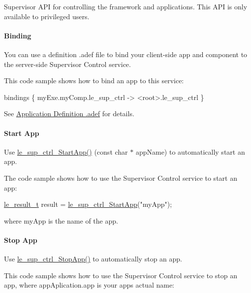 Supervisor A\+P\+I for controlling the framework and applications. This A\+P\+I is only available to privileged users.\hypertarget{c_sup_ctrl_legatoServicesSupervisor_binding}{}\paragraph{Binding}\label{c_sup_ctrl_legatoServicesSupervisor_binding}
You can use a definition {\ttfamily }.adef file to bind your client-\/side app and component to the server-\/side Supervisor Control service.

This code sample shows how to bind an app to this service\+: 
\begin{DoxyCode}
bindings
\{
myExe.myComp.le\_sup\_ctrl -> <root>.le\_sup\_ctrl
\}
\end{DoxyCode}


See \hyperlink{defFilesAdef}{Application Definition .adef} for details.\hypertarget{c_sup_ctrl_legatoServicesSupervisor_start}{}\paragraph{Start App}\label{c_sup_ctrl_legatoServicesSupervisor_start}
Use \hyperlink{le__sup__ctrl__interface_8h_a87aad682024480d38eaf889182703d61}{le\+\_\+sup\+\_\+ctrl\+\_\+\+Start\+App()} (const char $\ast$ app\+Name) to automatically start an app.

The code sample shows how to use the Supervisor Control service to start an app\+:


\begin{DoxyCode}
\hyperlink{le__basics_8h_a1cca095ed6ebab24b57a636382a6c86c}{le\_result\_t} result = \hyperlink{le__sup__ctrl__interface_8h_a87aad682024480d38eaf889182703d61}{le\_sup\_ctrl\_StartApp}(\textcolor{stringliteral}{"myApp"});
\end{DoxyCode}


where {\ttfamily my\+App} is the name of the app.\hypertarget{c_sup_ctrl_legatoServicesSupervisor_stop}{}\paragraph{Stop App}\label{c_sup_ctrl_legatoServicesSupervisor_stop}
Use \hyperlink{le__sup__ctrl__interface_8h_a468918cc7037de4641666cfa948f7216}{le\+\_\+sup\+\_\+ctrl\+\_\+\+Stop\+App()} to automatically stop an app.

This code sample shows how to use the Supervisor Control service to stop an app, where app\+Aplication.\+app is your app\textquotesingle{}s actual name\+:


